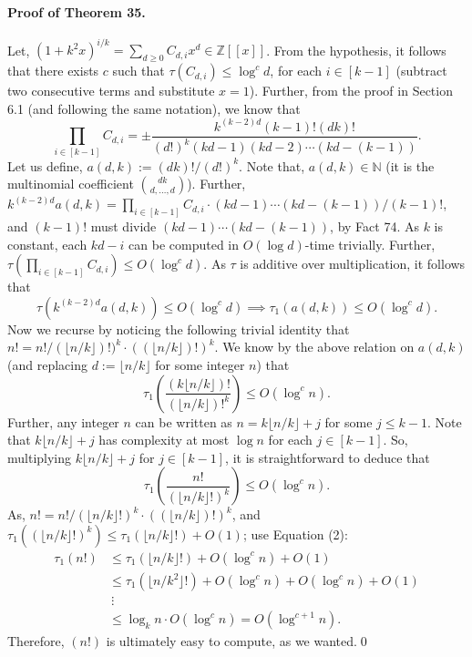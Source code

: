\documentclass[10pt,a4paper]{article}
\begin{document}
\paragraph{Proof of Theorem 35.} Let, $(1+k^2x)^{i/k}=\sum_{d\ge0}C_{d,i}x^d\in\mathbb Z[[x]]$. From the hypothesis, it follows that there exists $c$ such that $\tau(C_{d,i})\le\log^cd$, for each $i\in[k-1]$ (subtract two consecutive terms and substitute $x=1$). Further, from the proof in Section 6.1 (and following the same notation), we know that
\[\prod_{i\in[k-1]}C_{d,i}=\pm\frac{k^{(k-2)d}(k-1)!(dk)!}{(d!)^k(kd-1)(kd-2)\cdots(kd-(k-1))}.\]
Let us define, $a(d,k):=(dk)!/(d!)^k$. Note that, $a(d,k)\in\mathbb N$ (it is the multinomial coefficient $\binom{dk}{d,\ldots,d}$). Further, $k^{(k-2)d}a(d,k)=\prod_{i\in[k-1]}C_{d,i}\cdot(kd-1)\cdots(kd-(k-1))/(k-1)!$, and $(k-1)!$ must divide $(kd-1)\cdots(kd-(k-1))$, by Fact 74. As $k$ is constant, each $kd-i$ can be computed in $O(\log d)$-time trivially. Further, $\tau(\prod_{i\in[k-1]}C_{d,i})\le O(\log^cd)$. As $\tau$ is additive over multiplication, it follows that
\[\tau(k^{(k-2)d}a(d,k))\le O(\log^cd)\implies\tau_1(a(d,k))\le O(\log^cd).\]
Now we recurse by noticing the following trivial identity that $n!=n!/(\lfloor n/k\rfloor)!)^k\cdot((\lfloor n/k\rfloor)!)^k$. We know by the above relation on $a(d,k)$ (and replacing $d:=\lfloor n/k\rfloor$ for some integer $n$) that
\[\tau_1\left(\frac{(k\lfloor n/k\rfloor)!}{(\lfloor n/k\rfloor)!^k}\right)\le O(\log^cn).\]
Further, any integer $n$ can be written as $n=k\lfloor n/k\rfloor+j$ for some $j\le k-1$. Note that $k\lfloor n/k\rfloor+j$ has complexity at most $\log n$ for each $j\in[k-1]$. So, multiplying $k\lfloor n/k\rfloor+j$ for $j\in[k-1]$, it is straightforward to deduce that
\[\tau_1\left(\frac{n!}{(\lfloor n/k\rfloor!)^k}\right)\le O(\log^cn).\tag{2}\]
As, $n!=n!/(\lfloor n/k\rfloor!)^k\cdot((\lfloor n/k\rfloor)!)^k$, and $\tau_1((\lfloor n/k\rfloor!)^k)\le\tau_1(\lfloor n/k\rfloor!)+O(1)$; use Equation (2):
\begin{align*}\tau_1(n!)&\le\tau_1(\lfloor n/k\rfloor!)+O(\log^cn)+O(1)\\&\le\tau_1(\lfloor n/k^2\rfloor!)+O(\log^cn)+O(\log^cn)+O(1)\\&\ \vdots\\&\le\log_kn\cdot O(\log^cn)=O(\log^{c+1}n).\end{align*}
Therefore, $(n!)$ is ultimately easy to compute, as we wanted.\qed
\end{document}
